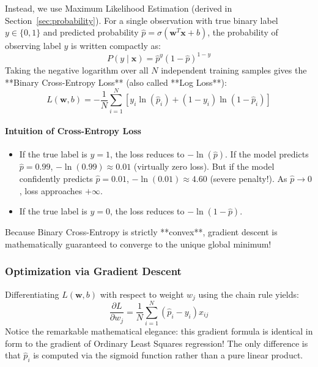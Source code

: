 Instead, we use Maximum Likelihood Estimation (derived in Section~\ref{sec:probability}). For a single observation with true binary label $y \in \{0, 1\}$ and predicted probability $\hat{p} = \sigma(\mathbf{w}^T \mathbf{x} + b)$, the probability of observing label $y$ is written compactly as:
\begin{equation}
P(y \mid \mathbf{x}) = \hat{p}^y (1 - \hat{p})^{1 - y}
\end{equation}
Taking the negative logarithm over all $N$ independent training samples gives the **Binary Cross-Entropy Loss** (also called **Log Loss**):
\begin{equation}
L(\mathbf{w}, b) = -\frac{1}{N} \sum_{i=1}^{N} \left[ y_i \ln(\hat{p}_i) + (1 - y_i) \ln(1 - \hat{p}_i) \right]\label{eq:binary_cross_entropy}
\end{equation}

\paragraph{Intuition of Cross-Entropy Loss}
\begin{itemize}
    \item If the true label is $y = 1$, the loss reduces to $-\ln(\hat{p})$. If the model predicts $\hat{p} = 0.99$, $-\ln(0.99) \approx 0.01$ (virtually zero loss). But if the model confidently predicts $\hat{p} = 0.01$, $-\ln(0.01) \approx 4.60$ (severe penalty!). As $\hat{p} \to 0$, loss approaches $+\infty$.
    \item If the true label is $y = 0$, the loss reduces to $-\ln(1 - \hat{p})$.
\end{itemize}
Because Binary Cross-Entropy is strictly **convex**, gradient descent is mathematically guaranteed to converge to the unique global minimum!

\subsubsection{Optimization via Gradient Descent}
Differentiating $L(\mathbf{w}, b)$ with respect to weight $w_j$ using the chain rule yields:
\begin{equation}
\frac{\partial L}{\partial w_j} = \frac{1}{N} \sum_{i=1}^{N} (\hat{p}_i - y_i) x_{ij}\label{eq:logistic_gradient}
\end{equation}
Notice the remarkable mathematical elegance: this gradient formula is identical in form to the gradient of Ordinary Least Squares regression! The only difference is that $\hat{p}_i$ is computed via the sigmoid function rather than a pure linear product.

